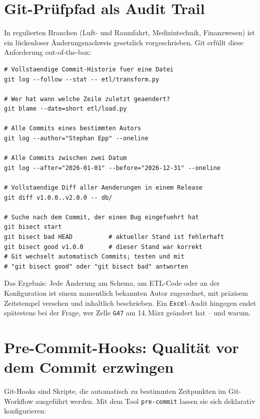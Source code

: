 ﻿\documentclass[12pt,a4paper]{report}
\theoremstyle{definition}
\theoremstyle{remark}
\newcommand{\excel}{\texttt{Excel}}
\newcommand{\code}[1]{\texttt{#1}}
\begin{document}
\section{Git-Prüfpfad als Audit Trail}

In regulierten Branchen (Luft- und Raumfahrt, Medizintechnik,
Finanzwesen) ist ein lückenloser Änderungsnachweis gesetzlich
vorgeschrieben. Git erfüllt diese Anforderung out-of-the-box:

\begin{lstlisting}[style=bash, caption={Audit-Trail-Abfragen mit Git}]
# Vollstaendige Commit-Historie fuer eine Datei
git log --follow --stat -- etl/transform.py

# Wer hat wann welche Zeile zuletzt geaendert?
git blame --date=short etl/load.py

# Alle Commits eines bestimmten Autors
git log --author="Stephan Epp" --oneline

# Alle Commits zwischen zwei Datum
git log --after="2026-01-01" --before="2026-12-31" --oneline

# Vollstaendige Diff aller Aenderungen in einem Release
git diff v1.0.0..v2.0.0 -- db/

# Suche nach dem Commit, der einen Bug eingefuehrt hat
git bisect start
git bisect bad HEAD          # aktueller Stand ist fehlerhaft
git bisect good v1.0.0       # dieser Stand war korrekt
# Git wechselt automatisch Commits; testen und mit
# "git bisect good" oder "git bisect bad" antworten
\end{lstlisting}

Das Ergebnis: Jede Änderung am Schema, am ETL-Code oder an der
Konfiguration ist einem namentlich bekannten Autor zugeordnet,
mit präzisem Zeitstempel versehen und inhaltlich beschrieben.
Ein \excel-Audit hingegen endet spätestens bei der Frage,
wer Zelle \code{G47} am 14.\,März geändert hat -- und warum.

\section{Pre-Commit-Hooks: Qualität vor dem Commit erzwingen}

Git-Hooks sind Skripte, die automatisch zu bestimmten Zeitpunkten
im Git-Workflow ausgeführt werden. Mit dem Tool \code{pre-commit}
lassen sie sich deklarativ konfigurieren:
\end{document}
